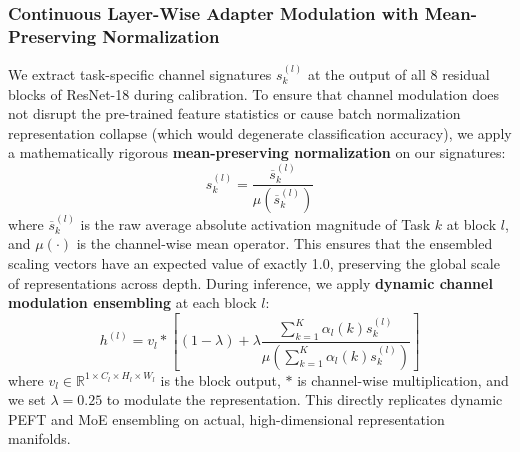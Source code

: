 \subsubsection{Continuous Layer-Wise Adapter Modulation with Mean-Preserving Normalization}
We extract task-specific channel signatures $s_k^{(l)}$ at the output of all 8 residual blocks of ResNet-18 during calibration. To ensure that channel modulation does not disrupt the pre-trained feature statistics or cause batch normalization representation collapse (which would degenerate classification accuracy), we apply a mathematically rigorous \textbf{mean-preserving normalization} on our signatures:
\begin{equation}
    s_k^{(l)} = \frac{\overline{s}_k^{(l)}}{\mu(\overline{s}_k^{(l)})}
\end{equation}
where $\overline{s}_k^{(l)}$ is the raw average absolute activation magnitude of Task $k$ at block $l$, and $\mu(\cdot)$ is the channel-wise mean operator. This ensures that the ensembled scaling vectors have an expected value of exactly 1.0, preserving the global scale of representations across depth. During inference, we apply \textbf{dynamic channel modulation ensembling} at each block $l$:
\begin{equation}
    h^{(l)} = v_l * \left[ (1 - \lambda) + \lambda \frac{\sum_{k=1}^K \alpha_l(k) s_k^{(l)}}{\mu(\sum_{k=1}^K \alpha_l(k) s_k^{(l)})} \right]
\end{equation}
where $v_l \in \mathbb{R}^{1 \times C_l \times H_l \times W_l}$ is the block output, $*$ is channel-wise multiplication, and we set $\lambda = 0.25$ to modulate the representation. This directly replicates dynamic PEFT and MoE ensembling on actual, high-dimensional representation manifolds.

